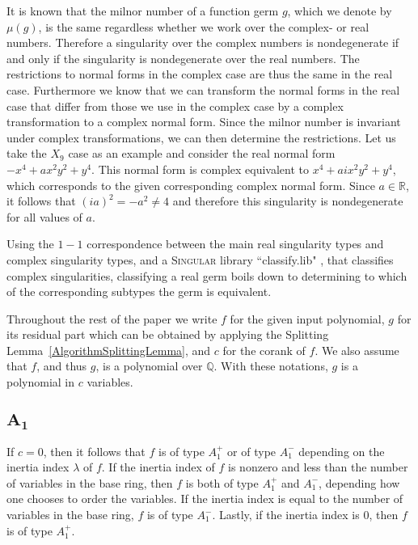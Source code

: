 \documentclass[noend]{amsproc}
\begin{document}
It is known that the milnor number of a function germ $g$, which we denote by
$\mu(g)$, is the same regardless whether we work over the complex- or real
numbers. Therefore a singularity over the complex numbers is nondegenerate if
and only if the singularity is nondegenerate over the real numbers. The
restrictions to normal forms in the complex case are thus the same in the real
case. Furthermore we know that we can transform the normal forms in the real
case that differ from those we use in the complex case by a complex
transformation to a complex normal form. Since the milnor number is invariant
under complex transformations, we can then determine the restrictions. Let us
take the $X_9$ case as an example and consider the real normal form
$-x^4+ax^2y^2+y^4$. This normal form is complex equivalent to
$x^4+aix^2y^2+y^4$, which corresponds to the given corresponding complex normal
form. Since $a\in\mathbb R$, it follows that $(ia)^2=-a^2\neq4$ and therefore
this singularity is nondegenerate for all values of $a$.

Using the $1-1$ correspondence between the main real singularity types and
complex singularity types, and a \textsc{Singular} library ``classify.lib"
\cite{classify}, that classifies complex singularities, classifying a real germ
boils down to determining to which of the corresponding subtypes the germ is
equivalent.

Throughout the rest of the paper we write $f$ for the given input polynomial,
$g$ for its residual part which can be obtained by applying the Splitting
Lemma~\ref{AlgorithmSplittingLemma}, and $c$ for the corank of $f$.
We also assume that $f$, and thus $g$, is a polynomial over $\mathbb Q$.
With these notations, $g$ is a polynomial in $c$ variables.

\subsection{$\boldsymbol{A_1}$}
If $c = 0$, then it follows  that $f$ is of type
$A_1^+$ or of type $A_1^-$ depending on the inertia index $\lambda$ of $f$. If
the inertia index of $f$ is nonzero and less than the number of variables in
the base ring, then $f$ is both of type $A_1^+$ and $A_1^-$, depending how one
chooses to order the variables. If the inertia index is equal to the number of
variables in the base ring, $f$ is of type $A_1^-$. Lastly, if the inertia
index is $0$, then $f$ is of type $A_1^+$.
\end{document}
